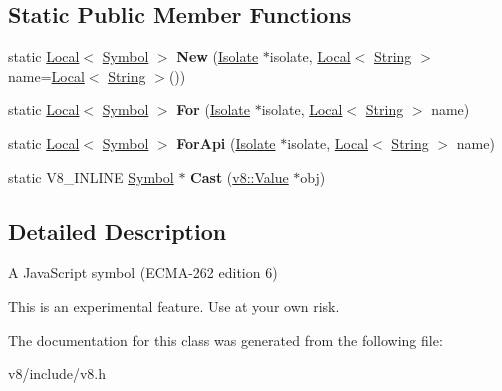 \subsection*{Static Public Member Functions}
\begin{DoxyCompactItemize}
\item 
\hypertarget{classv8_1_1Symbol_add1f6084974464105b56595d34c14ab9}{static \hyperlink{classv8_1_1Local}{Local}$<$ \hyperlink{classv8_1_1Symbol}{Symbol} $>$ {\bfseries New} (\hyperlink{classv8_1_1Isolate}{Isolate} $\ast$isolate, \hyperlink{classv8_1_1Local}{Local}$<$ \hyperlink{classv8_1_1String}{String} $>$ name=\hyperlink{classv8_1_1Local}{Local}$<$ \hyperlink{classv8_1_1String}{String} $>$())}\label{classv8_1_1Symbol_add1f6084974464105b56595d34c14ab9}

\item 
\hypertarget{classv8_1_1Symbol_a8a4a6bdc7d3e31c71cf48fa5cb811fc8}{static \hyperlink{classv8_1_1Local}{Local}$<$ \hyperlink{classv8_1_1Symbol}{Symbol} $>$ {\bfseries For} (\hyperlink{classv8_1_1Isolate}{Isolate} $\ast$isolate, \hyperlink{classv8_1_1Local}{Local}$<$ \hyperlink{classv8_1_1String}{String} $>$ name)}\label{classv8_1_1Symbol_a8a4a6bdc7d3e31c71cf48fa5cb811fc8}

\item 
\hypertarget{classv8_1_1Symbol_ac3937f0b0b831c4be495a399f26d7301}{static \hyperlink{classv8_1_1Local}{Local}$<$ \hyperlink{classv8_1_1Symbol}{Symbol} $>$ {\bfseries For\-Api} (\hyperlink{classv8_1_1Isolate}{Isolate} $\ast$isolate, \hyperlink{classv8_1_1Local}{Local}$<$ \hyperlink{classv8_1_1String}{String} $>$ name)}\label{classv8_1_1Symbol_ac3937f0b0b831c4be495a399f26d7301}

\item 
\hypertarget{classv8_1_1Symbol_a6bb214df5e2d8655379a648530aebaf1}{static V8\-\_\-\-I\-N\-L\-I\-N\-E \hyperlink{classv8_1_1Symbol}{Symbol} $\ast$ {\bfseries Cast} (\hyperlink{classv8_1_1Value}{v8\-::\-Value} $\ast$obj)}\label{classv8_1_1Symbol_a6bb214df5e2d8655379a648530aebaf1}

\end{DoxyCompactItemize}


\subsection{Detailed Description}
A Java\-Script symbol (E\-C\-M\-A-\/262 edition 6)

This is an experimental feature. Use at your own risk. 

The documentation for this class was generated from the following file\-:\begin{DoxyCompactItemize}
\item 
v8/include/v8.\-h\end{DoxyCompactItemize}
